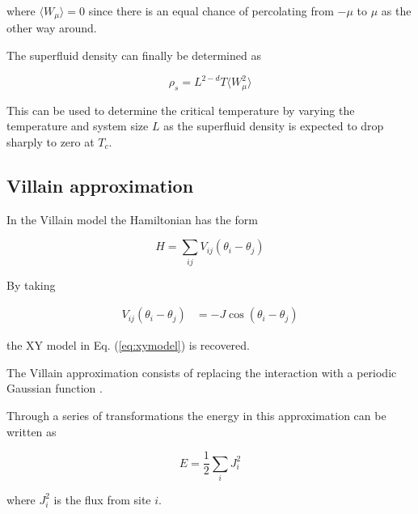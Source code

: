 \noindent where $\langle W_\mu \rangle = 0$ since there is an equal chance of percolating from $-\mu$ to $\mu$ as the other way around.

The superfluid density can finally be determined as

\begin{equation}
    \rho_s = L^{2 - d} T \langle W_\mu^2 \rangle 
\end{equation}

This can be used to determine the critical temperature by varying the temperature and system size $L$ as the superfluid density is expected to drop sharply to zero at $T_c$. 

\subsection{Villain approximation}
\label{subsec:villainApprox}


In the Villain model the Hamiltonian has the form \cite{Villain:VillainOriginalPaper}

\begin{equation}    
    H = \sum_{ij} V_{ij}( \theta_i - \theta_j)
\end{equation}

By taking

\begin{align}
    V_{ij}( \theta_i - \theta_j) &= -J \cos ( \theta_i - \theta_j)
\end{align}

\noindent the XY model in Eq. (\ref{eq:xymodel}) is recovered.

The Villain approximation consists of replacing the interaction with a periodic Gaussian function \cite{Villain:VillainOriginalPaper}.

Through a series of transformations the energy in this approximation can be written as \cite{Jos:VillainExtended}

\begin{equation}
    E = \frac{1}{2} \sum_i J_i^2
\end{equation}

\noindent where $J_i^2$ is the flux from site $i$.



